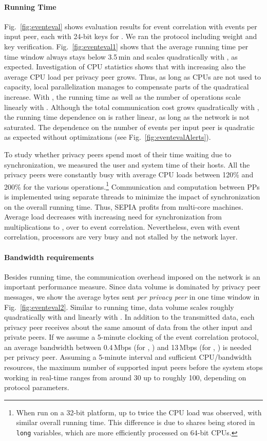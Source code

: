 \documentclass[letterpaper,11pt,onecolumn,titlepage]{article}
\begin{document}
\paragraph{Running Time}
Fig.~\ref{fig:eventeval} shows evaluation results for event correlation with  events per input peer, each with 24-bit keys for . We ran the protocol including weight and key verification.
Fig.~\ref{fig:eventeval1} shows that the average running time per time window always stays below 3.5\,min and scales quadratically with , as expected. 
Investigation of CPU statistics shows that with increasing  also the average CPU load per privacy peer grows. Thus, as long as CPUs are not used to capacity, local parallelization manages to compensate parts of the quadratical increase. With , the running time as well as the number of operations scale linearly with . 
Although the total communication cost grows quadratically with , the running time dependence on  is rather linear, as long as the network is not saturated.  The dependence on the number of events per input peer  is quadratic as expected without optimizations (see Fig.~\ref{fig:eventevalAlerts}).

To study whether privacy peers spend most of their time waiting due to synchronization, we measured the user and system time of their hosts. All the privacy peers were constantly busy with average CPU loads between 120\% and 200\% for the various operations.\footnote{When run on a 32-bit platform, up to twice the CPU load was observed, with similar overall running time. This difference is due to shares being stored in \texttt{long} variables, which are more efficiently processed on 64-bit CPUs.} Communication and computation between PPs is implemented using separate threads to minimize the impact of synchronization on the overall running time. Thus, SEPIA profits from multi-core machines. Average load decreases with increasing need for synchronization from multiplications to , over  to event correlation. Nevertheless, even with event correlation, processors are very busy and not stalled by the network layer.



\paragraph{Bandwidth requirements}
Besides running time, the communication overhead imposed on the network is an important performance measure. 
Since data volume is dominated by privacy peer messages, we show the average bytes sent
\emph{per privacy peer} in one time window in Fig.~\ref{fig:eventeval2}. Similar to
running time, data volume scales roughly quadratically with  and linearly with .
In addition to the transmitted data, each privacy peer receives about the same amount of data from
the other input and private peers. 
If we assume a 5-minute clocking of the event correlation protocol, an average bandwidth between 0.4\,Mbps (for , ) and
13\,Mbps (for , ) is needed per privacy peer.
Assuming a 5-minute interval and sufficient CPU/bandwidth resources, the maximum number of supported input peers before the system stops working in real-time ranges from around 30 up to roughly 100, depending on protocol parameters.
\end{document}
